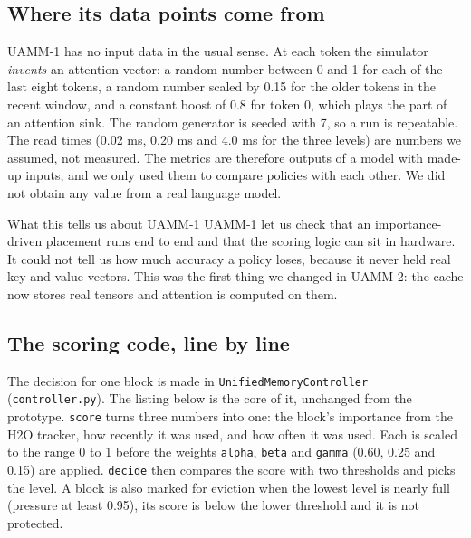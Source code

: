 \documentclass[12pt,a4paper]{report}
\begin{document}
\subsection{Where its data points come from}
UAMM-1 has no input data in the usual sense. At each token the simulator \textit{invents} an attention vector: a random number between 0 and 1 for each of the last eight tokens, a random number scaled by 0.15 for the older tokens in the recent window, and a constant boost of 0.8 for token 0, which plays the part of an attention sink. The random generator is seeded with 7, so a run is repeatable. The read times (0.02 ms, 0.20 ms and 4.0 ms for the three levels) are numbers we assumed, not measured. The metrics are therefore outputs of a model with made-up inputs, and we only used them to compare policies with each other. We did not obtain any value from a real language model.

\begin{calloutbox}{What this tells us about UAMM-1}
UAMM-1 let us check that an importance-driven placement runs end to end and that the scoring logic can sit in hardware. It could not tell us how much accuracy a policy loses, because it never held real key and value vectors. This was the first thing we changed in UAMM-2: the cache now stores real tensors and attention is computed on them.

\end{calloutbox}
\subsection{The scoring code, line by line}
The decision for one block is made in \texttt{UnifiedMemoryController} (\texttt{controller.\allowbreak{}py}). The listing below is the core of it, unchanged from the prototype. \texttt{score} turns three numbers into one: the block's importance from the H2O tracker, how recently it was used, and how often it was used. Each is scaled to the range 0 to 1 before the weights \texttt{alpha}, \texttt{beta} and \texttt{gamma} (0.60, 0.25 and 0.15) are applied. \texttt{decide} then compares the score with two thresholds and picks the level. A block is also marked for eviction when the lowest level is nearly full (pressure at least 0.95), its score is below the lower threshold and it is not protected.
\end{document}
